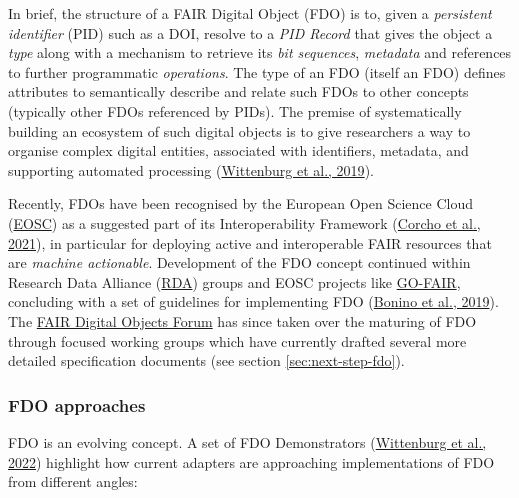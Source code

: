 In brief, the structure of a FAIR Digital Object (FDO) is to, given a \emph{persistent identifier} (PID) such as a DOI, resolve to a \emph{PID Record} that gives the object a \emph{type} along with a mechanism to retrieve its \emph{bit sequences}, \emph{metadata} and references to further programmatic \emph{operations}. The type of an FDO (itself an FDO) defines attributes to semantically describe and relate such FDOs to other concepts (typically other FDOs referenced by PIDs). The premise of systematically building an ecosystem of such digital objects is to give researchers a way to organise complex digital entities, associated with identifiers, metadata, and supporting automated processing (\protect\hyperlink{ref-tz0P3DTC}{Wittenburg et al., 2019}).

Recently, FDOs have been recognised by the European Open Science Cloud (\href{https://eosc.eu/}{EOSC}) as a suggested part of its Interoperability Framework (\protect\hyperlink{ref-aCye3KpE}{Corcho et al., 2021}), in particular for deploying active and interoperable FAIR resources that are \emph{machine actionable}. Development of the FDO concept continued within Research Data Alliance (\href{https://www.rd-alliance.org/}{RDA}) groups and EOSC projects like \href{https://www.go-fair.org/}{GO-FAIR}, concluding with a set of guidelines for implementing FDO (\protect\hyperlink{ref-RwvirqWg}{Bonino et al., 2019}). The \href{https://fairdo.org/}{FAIR Digital Objects Forum} has since taken over the maturing of FDO through focused working groups which have currently drafted several more detailed specification documents (see section \ref{sec:next-step-fdo}).

\hypertarget{fdo-approaches}{%
\subsubsection{FDO approaches}\label{fdo-approaches}}

FDO is an evolving concept. A set of FDO Demonstrators (\protect\hyperlink{ref-jRWurmQc}{Wittenburg et al., 2022}) highlight how current adapters are approaching implementations of FDO from different angles:

